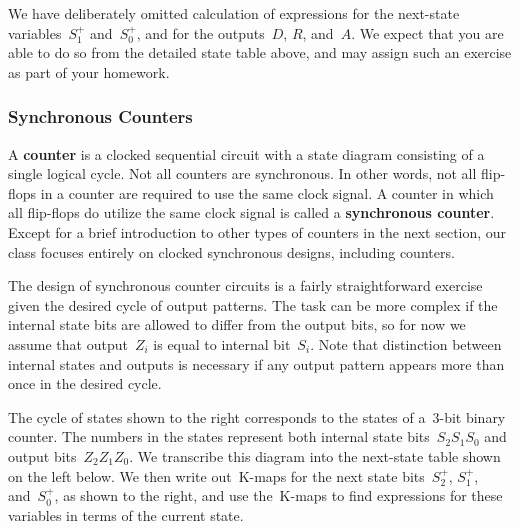We have deliberately omitted calculation of expressions for the
next-state variables~$S_1^+$ and~$S_0^+$,
and for the outputs~$D$,
$R$, and~$A$.  We expect that you are able to do so from the 
detailed state table above, and may assign such an exercise as
part of your homework.\\


\subsubsection{Synchronous Counters}

A {\bf counter} is a clocked sequential circuit with a state diagram
consisting of a single logical cycle.
%
Not all counters are synchronous.
In other words, not all flip-flops in a counter are required to use 
the same clock signal.  A counter in which all flip-flops do 
utilize the same clock
signal is called a {\bf synchronous counter}.  
%
Except for a brief introduction to other types of counters in the
next section, our class focuses entirely on clocked synchronous designs,
including counters.


\begin{minipage}{4.75in}
The design of synchronous counter circuits is a fairly straightforward
exercise given the desired cycle of output patterns. 
%
The task can be more complex if the internal state bits
are allowed to differ from the output bits, so for now
we assume that output~$Z_i$ is equal to internal bit~$S_i$.
Note that distinction between internal states and outputs is necessary 
if any output pattern appears more than once in the desired cycle. \mpline

The cycle of states shown to the right corresponds to the
states of a~\mbox{3-bit} binary counter.  The numbers in the states
represent both internal state bits~$S_2S_1S_0$ and output bits~$Z_2Z_1Z_0$.
We transcribe this diagram into the next-state table shown on the left below.
We then write out~\mbox{K-maps} for
the next state bits~$S_2^+$, $S_1^+$, and~$S_0^+$, as shown to the right,
and use the~\mbox{K-maps} to find expressions for these variables in
terms of the current state.
\end{minipage}\hspace{0.25in}%
\begin{minipage}{1.5in}
\end{minipage}\vspace{12pt}

